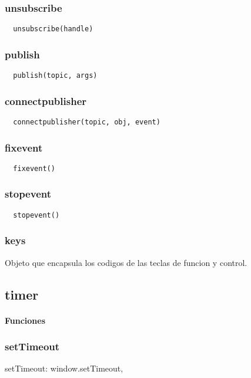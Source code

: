 \subsubsection*{unsubscribe}
\begin{verbatim}
  unsubscribe(handle)
\end{verbatim}

\subsubsection*{publish}
\begin{verbatim}
  publish(topic, args)
\end{verbatim}

\subsubsection*{connectpublisher}
\begin{verbatim}
  connectpublisher(topic, obj, event)
\end{verbatim}

\subsubsection*{fixevent}
\begin{verbatim}
  fixevent()
\end{verbatim}

\subsubsection*{stopevent}
\begin{verbatim}
  stopevent()
\end{verbatim}

\subsubsection*{keys}
Objeto que encapsula los codigos de las teclas de funcion y control.

\subsection{timer}

\paragraph{Funciones}
\subsubsection*{setTimeout}
setTimeout: window.setTimeout,
